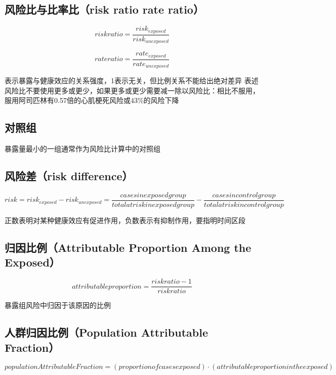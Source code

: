 \documentclass[]{book}
\begin{document}
\hypertarget{risk-ratio-rate-ratio}{%
\subsection{风险比与比率比（risk ratio rate ratio）}\label{risk-ratio-rate-ratio}}

\[risk ratio = \frac{risk_{exposed}}{risk_{unexposed}}\]

\[rate ratio = \frac{rate_{exposed}}{rate_{unexposed}}\]

表示暴露与健康效应的关系强度，1表示无关，但比例关系不能给出绝对差异
表述风险比不要使用更多或更少，如果更多或更少需要减一除以风险比：相比不服用，服用阿司匹林有0.57倍的心肌梗死风险或43\%的风险下降

\subsection{对照组}

暴露量最小的一组通常作为风险比计算中的对照组

\hypertarget{risk-difference}{%
\subsection{风险差（risk difference）}\label{risk-difference}}

\[risk = risk_{exposed} - risk_{unexposed} = \frac{cases in exposed group}{total at risk in exposed group} - \frac{cases in control group}{total at risk in control group}\]

正数表明对某种健康效应有促进作用，负数表示有抑制作用，要指明时间区段

\hypertarget{attributable-proportion-among-the-exposed}{%
\subsection{归因比例（Attributable Proportion Among the Exposed）}\label{attributable-proportion-among-the-exposed}}

\[attributable proportion = \frac{risk ratio - 1}{risk ratio}\]

暴露组风险中归因于该原因的比例

\hypertarget{population-attributable-fraction}{%
\subsection{人群归因比例（Population Attributable Fraction）}\label{population-attributable-fraction}}

\[population Attributable Fraction = (proportion of cases exposed) \cdot (attributable proportion in the exposed)\]
\end{document}
